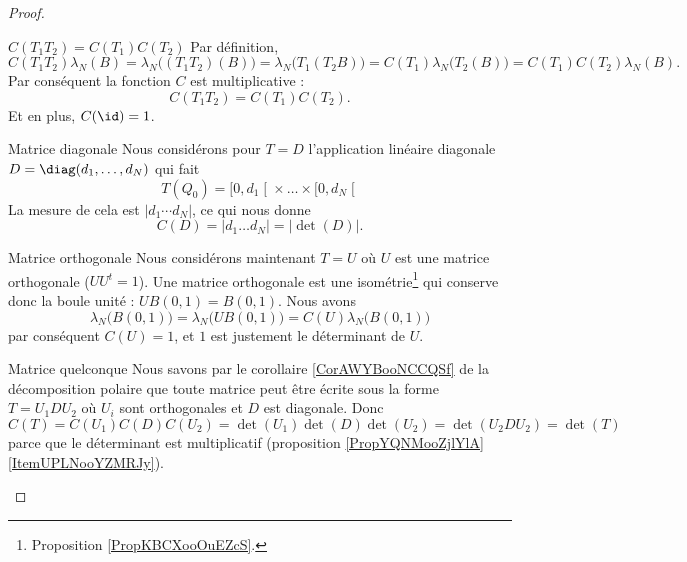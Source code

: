 \begin{proof}
    \begin{subproof}
        \item[\( C(T_1T_2)=C(T_1)C(T_2)\)]
            Par définition, 
            \begin{equation}
                C(T_1T_2)\lambda_N(B)=\lambda_N\big( (T_1T_2)(B) \big)=\lambda_N\big( T_1(T_2B) \big)=C(T_1)\lambda_N\big( T_2(B) \big)=C(T_1)C(T_2)\lambda_N(B).
            \end{equation}
            Par conséquent la fonction \( C\) est multiplicative : 
            \begin{equation}
                C(T_1T_2)=C(T_1)C(T_2).
            \end{equation}
            Et en plus, \( C(\id)=1\).
        \item[Matrice diagonale]
            Nous considérons pour \( T=D\) l'application linéaire diagonale \( D=\diag(d_1,\ldots, d_N)\) qui fait
            \begin{equation}
                T(Q_0)=\mathopen[ 0 , d_1 \mathclose[\times \ldots\times \mathopen[  0, d_N \mathclose[
            \end{equation}
            La mesure de cela est \( |d_1\cdots d_N|\), ce qui nous donne
            \begin{equation}
                C(D)=| d_1\ldots d_N |=| \det(D) |.
            \end{equation}
        \item[Matrice orthogonale]
            Nous considérons maintenant \( T=U\) où \( U\) est une matrice orthogonale (\( UU^t=1\)). Une matrice orthogonale est une isométrie\footnote{Proposition \ref{PropKBCXooOuEZcS}.} qui conserve donc la boule unité : \( UB(0,1)=B(0,1)\). Nous avons
            \begin{equation}
                \lambda_N\big( B(0,1) \big)=\lambda_N\big( UB(0,1) \big)=C(U)\lambda_N\big( B(0,1) \big)
            \end{equation}
            par conséquent \( C(U)=1\), et \( 1\) est justement le déterminant de \( U\).
        \item[Matrice quelconque]
            Nous savons par le corollaire \ref{CorAWYBooNCCQSf} de la décomposition polaire que toute matrice peut être écrite sous la forme \( T=U_1DU_2\) où \( U_i\) sont orthogonales et \( D\) est diagonale. Donc \( C(T)=C(U_1)C(D)C(U_2)=\det(U_1)\det(D)\det(U_2)=\det(U_2DU_2)=\det(T)\) parce que le déterminant est multiplicatif (proposition \ref{PropYQNMooZjlYlA}\ref{ItemUPLNooYZMRJy}).
    \end{subproof}
\end{proof}

